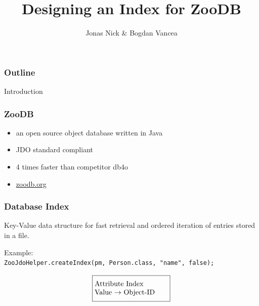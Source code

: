 \documentclass{beamer}
\title{Designing an Index for ZooDB}
\author{Jonas Nick \& Bogdan Vancea}
\begin{document}
  \frame{\titlepage}
  \begin{frame}
    \frametitle{Outline}
    \tableofcontents[hideallsubsections]
  \end{frame}

  \begin{section}{Introduction}
    \begin{frame}
      \frametitle{ZooDB}
      \begin{itemize}
        \item an open source object database written in Java
        \item JDO standard compliant
        \item 4 times faster than competitor db4o
        \item \url{zoodb.org}
      \end{itemize}

    \end{frame}
    \begin{frame}
      \frametitle{Database Index}
      \begin{block}{}
          Key-Value data structure for fast retrieval and ordered iteration of entries stored in a file.
      \end{block}
      \vspace{1em}
      \pause
      Example: \\
      \texttt{ZooJdoHelper.createIndex(pm, Person.class, "name", false);}
      \pause
      \begin{align*}
      \fbox{\parbox[t][3em][c]{0.29\textwidth}{Attribute Index\\ Value $\rightarrow$ Object-ID} }
      \end{align*}
      \pause
      \vspace{-0.9cm}
      \begin{center}
      \end{center}
    \end{frame}


\end{section}
\end{document}
